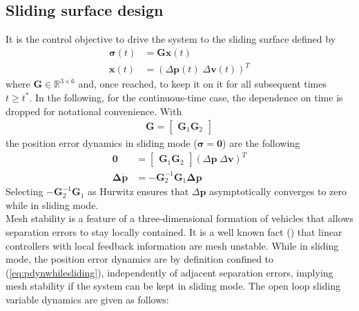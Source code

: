 \documentclass{ifacconf}
\providecommand{\mbf}[1]{\mathbf{#1}}
\begin{document}
\subsection{Sliding surface design}
It is the control objective to drive the system to the sliding surface defined by
\begin{align}
\mbf{\sigma}(t) &= \mbf{G}\mbf{x}(t)
\label{eq:defsigmaconti-} \\
\mbf{x}(t) &=
(
\Delta \mbf{p}(t) \;
\Delta \mbf{v}(t)
)^T
\end{align}
where $ \mbf{G} \in \mathbb{R}^{3 \times 6}$ and, once reached, to keep it on it for all subsequent times $t \geq t^*$. In the following, for the continuous-time case, the dependence on time is dropped for notational convenience. With
\begin{align}
\mbf{G} =
\begin{bmatrix}
\mbf{G}_1 \mbf{G}_2
\end{bmatrix}
\end{align}
the position error dynamics in sliding mode ($\mbf{\sigma} = \mbf{0}$) are the following 
\begin{align} 
\mbf{0}
&=
\begin{bmatrix}
\mbf{G}_1 \mbf{G}_2
\end{bmatrix}
(
\Delta \mbf{p} \;
\Delta \mbf{v}
)^T \\
\mbf{\Delta} \dot{\mbf{p}}
&= - \mbf{G}_2^{-1} \mbf{G}_1 \mbf{\Delta} \mbf{p}
\label{eq:pdynwhilesliding}
\end{align}
Selecting $- \mbf{G}_2^{-1} \mbf{G}_1$ as Hurwitz ensures that $\Delta \mbf{p}$ asymptotically converges to zero while in sliding mode.\\
Mesh stability is a feature of a three-dimensional formation of vehicles that allows separation errors to stay locally contained. It is a well known fact (\cite{Pant2002}) that linear controllers with local feedback information are mesh unstable.
While in sliding mode, the position error dynamics are by definition confined to (\ref{eq:pdynwhilesliding}), independently of adjacent separation errors, implying mesh stability if the system can be kept in sliding mode.
The open loop sliding variable dynamics are given as follows:
\end{document}
